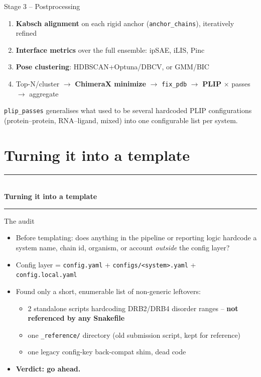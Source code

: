 \documentclass[aspectratio=169]{beamer}
\newcommand{\currentsubsectionname}{}
\newcommand{\sectiondivider}[1]{%
  {\setbeamertemplate{frametitle}{}%
  \begin{frame}
    \vfill
    \begin{center}
      {\color{accent}\rule{0.35\textwidth}{0.6pt}}\\[1.1em]
      {\color{fgtext}\Huge\bfseries #1}\\[1.1em]
      {\color{accent}\rule{0.35\textwidth}{0.6pt}}
    \end{center}
    \vfill
  \end{frame}}%
}
\begin{document}
\begin{frame}{Stage 3 -- Postprocessing}
  \begin{enumerate}
    \item \textbf{Kabsch alignment} on each rigid anchor
      (\texttt{anchor\_chains}), iteratively refined
    \item \textbf{Interface metrics} over the full ensemble: ipSAE, iLIS,
      Pinc
    \item \textbf{Pose clustering}: HDBSCAN+Optuna/DBCV, or GMM/BIC
    \item Top-N/cluster $\to$ \textbf{ChimeraX minimize} $\to$
      \texttt{fix\_pdb} $\to$ \textbf{PLIP} $\times$ passes $\to$ aggregate
  \end{enumerate}
  \vspace{0.5em}
  \small \texttt{plip\_passes} generalises what used to be several
  hardcoded PLIP configurations (protein--protein, RNA--ligand, mixed)
  into one configurable list per system.
\end{frame}

\section{Turning it into a template}
\gdef\currentsubsectionname{}
\sectiondivider{Turning it into a template}

\begin{frame}{The audit}
  \begin{itemize}
    \item Before templating: does anything in the pipeline or reporting
      logic hardcode a system name, chain id, organism, or account
      \emph{outside} the config layer?
    \item Config layer = \texttt{config.yaml} + \texttt{configs/<system>.yaml}
      + \texttt{config.local.yaml}
    \item Found only a short, enumerable list of non-generic leftovers:
      \begin{itemize}
        \item 2 standalone scripts hardcoding DRB2/DRB4 disorder ranges --
          \textbf{not referenced by any Snakefile}
        \item one \texttt{\_reference/} directory (old submission script,
          kept for reference)
        \item one legacy config-key back-compat shim, dead code
      \end{itemize}
    \item[$\Rightarrow$] \textcolor{substrate}{\textbf{Verdict: go ahead.}}
  \end{itemize}
\end{frame}
\end{document}
